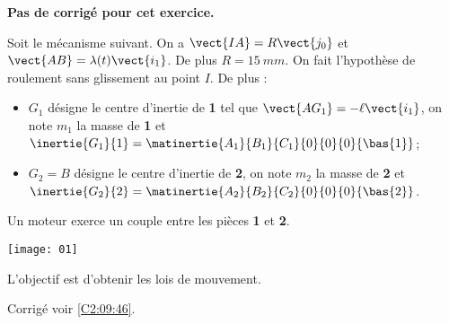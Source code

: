 \normalfalse \difficiletrue \tdifficilefalse
\correctionfalse


\setcounter{numques}{0}
\ifcorrection
\else
\textbf{Pas de corrigé pour cet exercice.}
\fi

\ifprof
\else
Soit le mécanisme suivant. On a $\vect{IA}=R\vect{j_0}$ et $\vect{AB}=\lambda(t)\vect{i_1}$. De plus $R=\SI{15}{mm}$.
On fait l'hypothèse de roulement sans glissement au point $I$. De plus :
\begin{itemize}
\item $G_1$ désigne le centre d'inertie de \textbf{1} tel que $\vect{AG_1}=-\ell\vect{i_1}$, on note $m_1$ la masse de \textbf{1} et $\inertie{G_1}{1}=\matinertie{A_1}{B_1}{C_1}{0}{0}{0}{\bas{1}}$; 
\item $G_2=B$ désigne le centre d'inertie de \textbf{2}, on note $m_2$ la masse de \textbf{2} et $\inertie{G_2}{2}=\matinertie{A_2}{B_2}{C_2}{0}{0}{0}{\bas{2}}$.
\end{itemize}
Un moteur exerce un couple entre les pièces \textbf{1} et \textbf{2}. 
\begin{center}
\texttt{[image: 01]}
\end{center}
\fi

L'objectif est d'obtenir les lois de mouvement. 

\ifprof
\else
\fi

\ifprof
\else
\fi


\ifprof
\else
\begin{flushright}
\footnotesize{Corrigé  voir \ref{C2:09:46}.}
\end{flushright}%
\fi